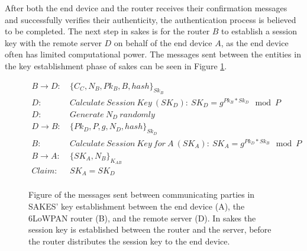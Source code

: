 
After both the end device and the router receives their confirmation messages and successfully verifies their authenticity, the authentication process is believed to be completed. The next step in \gls{sakes} is for the router $B$ to establish a session key with the remote server $D$ on behalf of the end device $A$, as the end device often has limited computational power. The messages sent between the entities in the key establishment phase of \gls{sakes} can be seen in Figure \ref{fig:sakes-keys}.

\begin{figure}[h]
\begin{tcolorbox}[title=Key Establishment in SAKES]
\begin{align*}
B \rightarrow D:\ & \{C_C, N_B, Pk_B, B, hash\}_{Sk_B} \\
D:\ & Calculate\ Session\ Key\ (SK_D):\ SK_D = g^{Pk_B * Sk_D} \mod{P}\\
D:\ & Generate\ N_D\ randomly\\
D \rightarrow B:\ & \{Pk_D, P, g, N_D, hash\}_{Sk_D}\\
B:\ & Calculate\ Session\ Key\ for\ A\ (SK_A):\ SK_A = g^{Pk_D * Sk_B} \mod{P}\\
B \rightarrow A:\ & \{SK_A, N_B\}_{K_{AB}}\\
Claim:\ & SK_A = SK_D\\
\end{align*}
\end{tcolorbox}
\caption{Figure of the messages sent between communicating parties in SAKES' key establishment between the end device (A), the 6LoWPAN router (B), and the remote server (D). In \gls{sakes} the session key is established between the router and the server, before the router distributes the session key to the end device.}
\label{fig:sakes-keys}
\end{figure}


